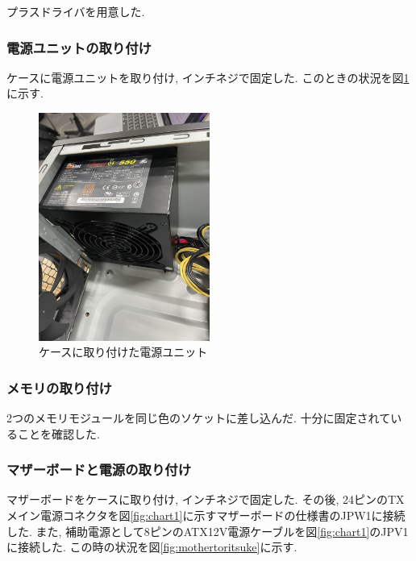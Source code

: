 \documentclass{ltjsarticle} %
\begin{document}
プラスドライバを用意した.

\subsubsection{電源ユニットの取り付け}

ケースに電源ユニットを取り付け, インチネジで固定した. このときの状況を図\ref{fig:dengentoritsuke}に示す.

\begin{figure}[H] %
  \centering
  \includegraphics[width=0.5\textwidth]{dengentoritsuke.jpg} %
  \caption{ケースに取り付けた電源ユニット} %
  \label{fig:dengentoritsuke} %
\end{figure}

\subsubsection{メモリの取り付け}

2つのメモリモジュールを同じ色のソケットに差し込んだ. 十分に固定されていることを確認した.

\subsubsection{マザーボードと電源の取り付け}

マザーボードをケースに取り付け, インチネジで固定した. 
その後, 24ピンのTXメイン電源コネクタを図\ref{fig:chart1}に示すマザーボードの仕様書のJPW1に接続した. 
また, 補助電源として8ピンのATX12V電源ケーブルを図\ref{fig:chart1}のJPV1に接続した. 
この時の状況を図\ref{fig:mothertoritsuke}に示す.
\end{document}

